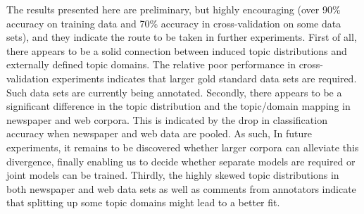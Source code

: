 \documentclass[11pt]{article}
\begin{document}
The results presented here are preliminary, but highly encouraging (over 90\% accuracy on training data and 70\% accuracy in cross-validation on some data sets), and they indicate the route to be taken in further experiments.
First of all, there appears to be a solid connection between induced topic distributions and externally defined topic domains.
The relative poor performance in cross-validation experiments indicates that larger gold standard data sets are required.
Such data sets are currently being annotated.
Secondly, there appears to be a significant difference in the topic distribution and the topic\slash domain mapping in newspaper and web corpora.
This is indicated by the drop in classification accuracy when newspaper and web data are pooled.
As such, 
In future experiments, it remains to be discovered whether larger corpora can alleviate this divergence, finally enabling us to decide whether separate models are required or joint models can be trained.
Thirdly, the highly skewed topic distributions in both newspaper and web data sets as well as comments from annotators indicate that splitting up some topic domains might lead to a better fit.



\end{document}
